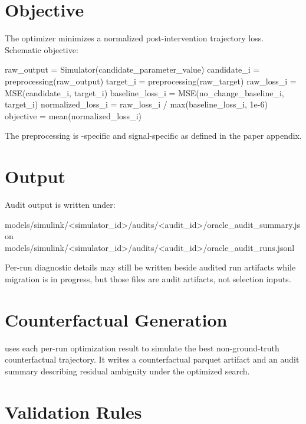 \documentclass[11pt]{article}
\begin{document}
\section*{Objective}

The optimizer minimizes a normalized post-intervention trajectory loss.
Schematic objective:

\begin{DocCode}
raw_output = Simulator(candidate_parameter_value)
candidate_i = preprocessing(raw_output)
target_i = preprocessing(raw_target)
raw_loss_i = MSE(candidate_i, target_i)
baseline_loss_i = MSE(no_change_baseline_i, target_i)
normalized_loss_i = raw_loss_i / max(baseline_loss_i, 1e-6)
objective = mean(normalized_loss_i)
\end{DocCode}

The preprocessing is \termSimulator-specific and signal-specific as defined in the paper appendix.

\section*{Output}

Audit output is written under:

\begin{DocCode}
models/simulink/<simulator_id>/audits/<audit_id>/oracle_audit_summary.json
models/simulink/<simulator_id>/audits/<audit_id>/oracle_audit_runs.jsonl
\end{DocCode}

Per-run diagnostic details may still be written beside audited run artifacts while migration is in progress, but those files are audit artifacts, not selection inputs.

\section*{Counterfactual Generation}

 uses each per-run optimization result to simulate the best non-ground-truth counterfactual trajectory.
It writes a counterfactual parquet artifact and an audit summary describing residual ambiguity under the optimized search.

\section*{Validation Rules}
\end{document}
